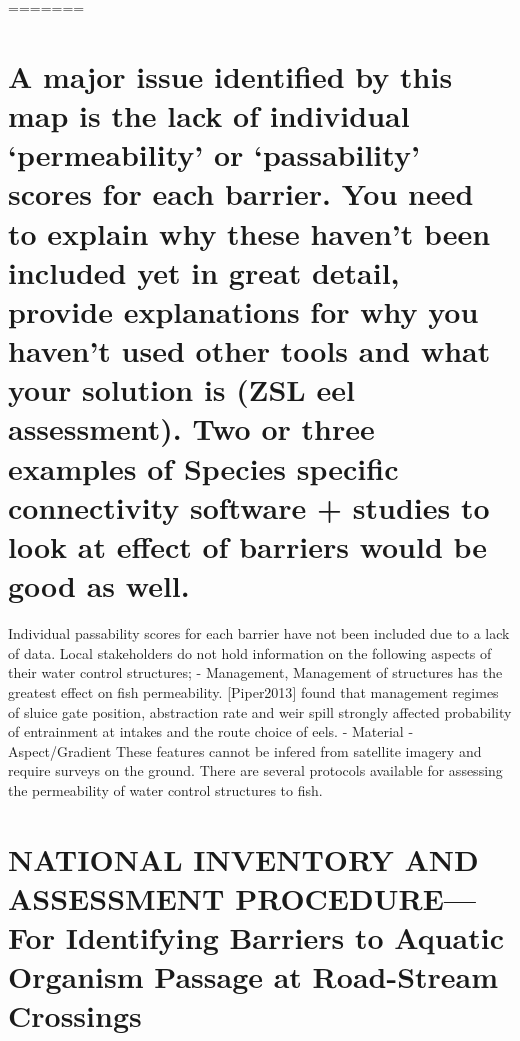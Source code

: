 \documentclass[]{article}
\begin{document}
=======

\hypertarget{a-major-issue-identified-by-this-map-is-the-lack-of-individual-permeability-or-passability-scores-for-each-barrier.-you-need-to-explain-why-these-havent-been-included-yet-in-great-detail-provide-explanations-for-why-you-havent-used-other-tools-and-what-your-solution-is-zsl-eel-assessment.-two-or-three-examples-of-species-specific-connectivity-software-studies-to-look-at-effect-of-barriers-would-be-good-as-well.}{%
\section{A major issue identified by this map is the lack of individual
`permeability' or `passability' scores for each barrier. You need to
explain why these haven't been included yet in great detail, provide
explanations for why you haven't used other tools and what your solution
is (ZSL eel assessment). Two or three examples of Species specific
connectivity software + studies to look at effect of barriers would be
good as
well.}\label{a-major-issue-identified-by-this-map-is-the-lack-of-individual-permeability-or-passability-scores-for-each-barrier.-you-need-to-explain-why-these-havent-been-included-yet-in-great-detail-provide-explanations-for-why-you-havent-used-other-tools-and-what-your-solution-is-zsl-eel-assessment.-two-or-three-examples-of-species-specific-connectivity-software-studies-to-look-at-effect-of-barriers-would-be-good-as-well.}}

Individual passability scores for each barrier have not been included
due to a lack of data. Local stakeholders do not hold information on the
following aspects of their water control structures; - Management,
Management of structures has the greatest effect on fish permeability.
{[}Piper2013{]} found that management regimes of sluice gate position,
abstraction rate and weir spill strongly affected probability of
entrainment at intakes and the route choice of eels. - Material -
Aspect/Gradient These features cannot be infered from satellite imagery
and require surveys on the ground. There are several protocols available
for assessing the permeability of water control structures to fish.

\hypertarget{national-inventory-and-assessment-procedurefor-identifying-barriers-to-aquatic-organism-passage-at-road-stream-crossings}{%
\section{NATIONAL INVENTORY AND ASSESSMENT PROCEDURE---For Identifying
Barriers to Aquatic Organism Passage at Road-Stream
Crossings}\label{national-inventory-and-assessment-procedurefor-identifying-barriers-to-aquatic-organism-passage-at-road-stream-crossings}}
\end{document}
